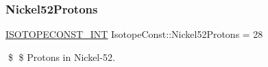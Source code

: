 \subsubsection{\texorpdfstring{Nickel52\+Protons}{Nickel52Protons}}
{\footnotesize\ttfamily \mbox{\hyperlink{group___isotope_const-_macros_ga5f18360b3e99483a35c32d789e62621c}{I\+S\+O\+T\+O\+P\+E\+C\+O\+N\+S\+T\+\_\+\+I\+NT}} Isotope\+Const\+::\+Nickel52\+Protons = 28}

\$ \$ Protons in Nickel-\/52. 